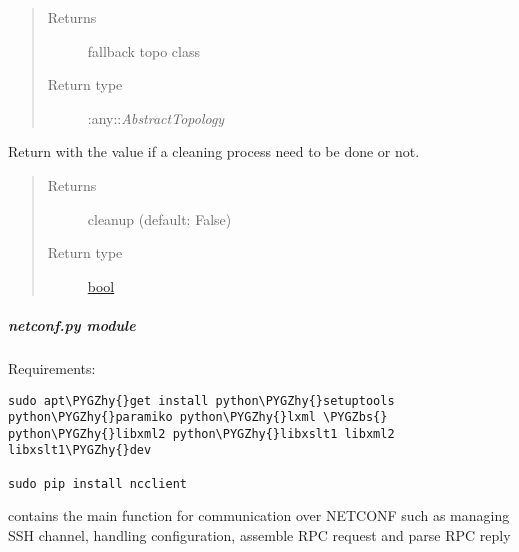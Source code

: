 \documentclass[letterpaper,10pt,english]{sphinxmanual}
\def\PYGZbs{\char`\\}
\def\PYGZhy{\char`\-}
\begin{document}
\begin{fulllineitems}
\begin{fulllineitems}
\begin{quote}
\begin{description}
\item[{Returns}] \leavevmode
fallback topo class

\item[{Return type}] \leavevmode
:any::\emph{AbstractTopology}

\end{description}\end{quote}

\end{fulllineitems}


\begin{fulllineitems}
\label{util/misc:escape.util.misc.ESCAPEConfig.get_clean_after_shutdown}
Return with the value if a cleaning process need to be done or not.
\begin{quote}\begin{description}
\item[{Returns}] \leavevmode
cleanup (default: False)

\item[{Return type}] \leavevmode
\href{https://docs.python.org/2.7/library/functions.html\#bool}{bool}

\end{description}\end{quote}

\end{fulllineitems}


\end{fulllineitems}



\subparagraph{\emph{netconf.py} module}
\label{util/netconf:netconf-py-module}\label{util/netconf::doc}
Requirements:

\begin{Verbatim}[commandchars=\\\{\}]
sudo apt\PYGZhy{}get install python\PYGZhy{}setuptools python\PYGZhy{}paramiko python\PYGZhy{}lxml \PYGZbs{}
python\PYGZhy{}libxml2 python\PYGZhy{}libxslt1 libxml2 libxslt1\PYGZhy{}dev

sudo pip install ncclient
\end{Verbatim}

{\hyperref[util/netconf:escape.util.netconf.AbstractNETCONFAdapter]{\emph{}}} contains the main function for communication
over NETCONF such as managing SSH channel, handling configuration, assemble
RPC request and parse RPC reply
\end{document}
